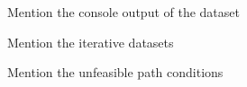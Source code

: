 \label{subsec:module:output}

Mention the console output of the dataset

Mention the iterative datasets

Mention the unfeasible path conditions